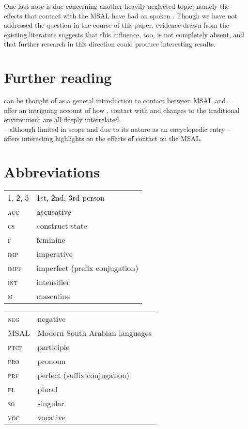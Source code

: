 \documentclass[output=paper]{langsci/langscibook}
\begin{document}
One last note is due concerning another heavily neglected topic, namely the effects that contact with the MSAL have had on spoken . Though we have not addressed the question in the course of this paper, evidence drawn from the existing literature \citep{Simeone-Senelle2002} suggests that this influence, too, is not completely absent, and that further research in this direction could produce interesting results. 

\section*{Further reading}

 \citet{Morris2017} can be thought of as a general introduction to contact between MSAL and . \\
 \citet{WatsonAl-Mahri2017} offer an intriguing account of how , contact with  and changes to the traditional environment are all deeply interrelated. \\ \citet{Lonnet2011} – although limited in scope and  due to its nature as an encyclopedic entry – offers interesting highlights on the effects of contact on the MSAL.

\section*{Abbreviations}

\begin{tabularx}{.45\textwidth}{@{}lQ@{}}
\textsc{1, 2, 3} & 1st, 2nd, 3rd person \\
\textsc{acc} & accusative \\
\textsc{cs} & construct state \\
\textsc{f} & feminine \\
\textsc{imp} & imperative \\
\textsc{impf} & imperfect (prefix conjugation) \\
\textsc{int} & intensifier \\
\textsc{m} & masculine \\
\end{tabularx}%
\begin{tabularx}{.5\textwidth}{@{}lQ@{}}
\textsc{neg} & negative \\
MSAL & {Modern South Arabian} languages \\
\textsc{ptcp} & {participle} \\
\textsc{pro} & pronoun \\
\textsc{prf} & perfect (suffix conjugation) \\
\textsc{pl} & plural \\
\textsc{sg} & singular \\
\textsc{voc} & {vocative} \\
\end{tabularx}%



\sloppy
\printbibliography[heading=subbibliography,notkeyword=this]
\end{document}
